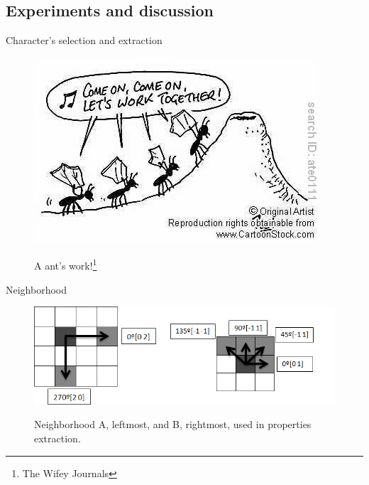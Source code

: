 \documentclass[notes]{beamer}
\begin{document}
\begin{frame}
\section{Experiments and discussion}

\begin{block}{Character's selection and extraction}

\begin{figure}[!htb]
\centering
\includegraphics[scale=0.5]{ants}
\label{fig:ants}
\caption{A ant's work!\footnote{The Wifey Journals\cite{Ants}}}
\end{figure}

\end{block}
{\let\thefootnote\relax\footnotetext{}}
\end{frame}

\begin{frame}

\begin{block}{Neighborhood}

\begin{figure}[!htb]
\centering
\includegraphics[scale=0.3]{neighbor}
\label{fig:neighbor}
\caption{Neighborhood A, leftmost, and B, rightmost, used in
properties extraction.}
\end{figure}

\end{block}

\end{frame}
\end{document}

